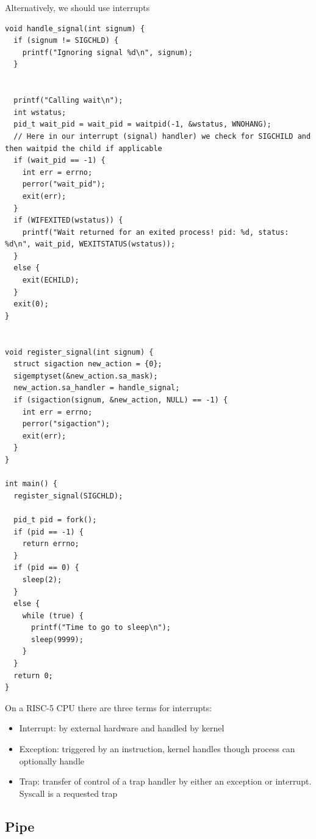 \documentclass[../notes.tex]{subfiles}
\begin{document}
Alternatively, we should use interrupts

\begin{listing}[H]
\begin{verbatim}
void handle_signal(int signum) {
  if (signum != SIGCHLD) {
    printf("Ignoring signal %d\n", signum);
  }


  printf("Calling wait\n");
  int wstatus;
  pid_t wait_pid = wait_pid = waitpid(-1, &wstatus, WNOHANG);
  // Here in our interrupt (signal) handler) we check for SIGCHILD and then waitpid the child if applicable
  if (wait_pid == -1) {
    int err = errno;
    perror("wait_pid");
    exit(err);
  }
  if (WIFEXITED(wstatus)) {
    printf("Wait returned for an exited process! pid: %d, status: %d\n", wait_pid, WEXITSTATUS(wstatus));
  }
  else {
    exit(ECHILD);
  }
  exit(0);
}


void register_signal(int signum) {
  struct sigaction new_action = {0};
  sigemptyset(&new_action.sa_mask);
  new_action.sa_handler = handle_signal;
  if (sigaction(signum, &new_action, NULL) == -1) {
    int err = errno;
    perror("sigaction");
    exit(err);
  }
}

int main() {
  register_signal(SIGCHLD);

  pid_t pid = fork();
  if (pid == -1) {
    return errno;
  }
  if (pid == 0) {
    sleep(2);
  }
  else {
    while (true) {
      printf("Time to go to sleep\n");
      sleep(9999);
    }
  }
  return 0;
}
\end{verbatim}
\end{listing}


On a RISC-5 CPU there are three terms for interrupts:

\begin{itemize}
    \item Interrupt: by external hardware and handled by kernel
    \item Exception: triggered by an instruction, kernel handles though process can optionally handle
    \item Trap: transfer of control of a trap handler by either an exception or interrupt. Syscall is a requested trap
\end{itemize}

\subsection{Pipe}
\end{document}
